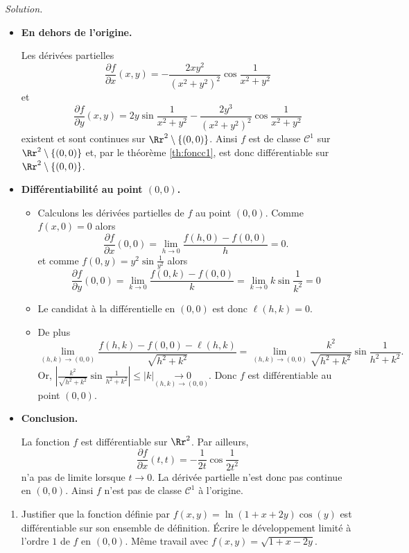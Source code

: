 \documentclass[12pt, class=report,crop=false]{standalone}
\begin{document}
{\begin{exemple}
\bigskip
\emph{Solution.}


\begin{itemize}
  \item \textbf{En dehors de l'origine.}
  
Les dérivées partielles 
$$\frac{\partial f}{\partial x}(x,y)=-\frac{2xy^2}{(x^2+y^2)^2}\cos \frac{1}{x^2+y^2}$$
et
$$\frac{\partial f}{\partial y}(x,y)=2y\sin \frac{1}{x^2+y^2}-\frac{2y^3}{(x^2+y^2)^2}\cos \frac{1}{x^2+y^2}$$
existent et sont continues sur $\Rr^2\setminus \{(0,0)\}$. 
Ainsi $f$ est de classe $\mathscr{C}^1$ sur $\Rr^2\setminus \{(0,0)\}$ et, par le théorème \ref{th:foncc1}, est donc différentiable sur $\Rr^2\setminus \{(0,0)\}$.


  \item \textbf{Différentiabilité au point $(0,0)$.} 
  \begin{itemize}
    \item Calculons les dérivées partielles de $f$ au point $(0,0)$. Comme $f(x,0)=0$ alors 
$$\frac{\partial f}{\partial x}(0,0)=\lim _{h\to 0}\frac{f(h,0)-f(0,0)}{h}=0.$$
et comme $f(0,y) = y^2\sin \frac{1}{y^2}$ alors 
$$\frac{\partial f}{\partial y}(0,0) = \lim _{k\to 0}\frac{f(0,k)-f(0,0)}{k}=\lim _{k\to 0}k\sin \frac{1}{k^2}=0$$
  \item Le candidat à la différentielle en $(0,0)$ est donc $\ell(h,k) = 0$. 
  \item De plus
$$\lim _{(h,k)\to (0,0)}\frac{f(h,k)-f(0,0)-\ell(h,k)}{\sqrt{h^2+k^2}}=\lim _{(h,k)\to (0,0)}\frac{k^2}{\sqrt{h^2+k^2}}\sin \frac{1}{h^2+k^2}.$$
Or, $\displaystyle \left|\frac{k^2}{\sqrt{h^2+k^2}}\sin \frac{1}{h^2+k^2}\right|\le |k|\underset{(h,k)\to(0,0)}{\longrightarrow 0}$. Donc $f$ est différentiable au point $(0,0)$.
  \end{itemize}
  \item \textbf{Conclusion.} 
  
  La fonction $f$ est différentiable sur $\Rr^2$. Par ailleurs, 
$$\frac{\partial f}{\partial x}(t,t)=-\frac{1}{2t}\cos \frac{1}{2t^2}$$ n'a pas de limite lorsque $t\to0$. La dérivée partielle n'est donc pas continue en $(0,0)$. Ainsi $f$ n'est pas de classe $\mathcal{C}^1$ à l'origine.

\end{itemize}
\end{exemple}



\begin{miniexercices}
\sauteligne
\begin{enumerate}
  \item Justifier que la fonction définie par 
  $f(x,y) =  \ln(1+x+2y)\cos(y)$ est différentiable sur son ensemble de définition. \'Ecrire le développement limité à l'ordre $1$ de $f$ en $(0,0)$. Même travail avec $f(x,y) = \sqrt{1+x-2y}$.


\end{enumerate}
\end{miniexercices}}
\end{document}

